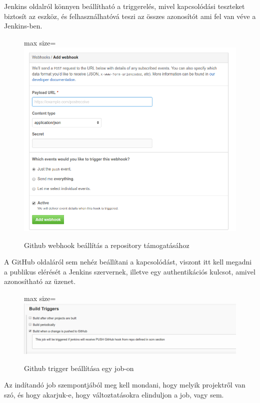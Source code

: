\documentclass[11pt,magyar,a4paper,twoside,]{report}
\let\Oldincludegraphics\includegraphics
\renewcommand{\includegraphics}[1]{
\begin{adjustbox}{max size={\textwidth}{\textheight}}
    \Oldincludegraphics[scale=0.6]{#1}%
\end{adjustbox}
}
\begin{document}
Jenkins oldalról könnyen beállítható a triggerelés, mivel kapcsolódási
teszteket biztosít az eszköz, és felhasználhatóvá teszi az összes
azonosítót ami fel van véve a Jenkins-ben.

\begin{figure}[H]
\centering
\includegraphics{img/github-webhooks.png}
\caption{Github webhook beállítás a repository
támogatásához\label{github-hook}}
\end{figure}

A GitHub oldaláról sem nehéz beállítani a kapcsolódást, viszont itt kell
megadni a publikus elérését a Jenkins szervernek, illetve egy
authentikációs kulcsot, amivel azonosítható az üzenet.

\begin{figure}[H]
\centering
\includegraphics{img/github-trigger.png}
\caption{Github trigger beállítása egy job-on\label{job-trigger}}
\end{figure}

Az indítandó job szempontjából meg kell mondani, hogy melyik projektről
van szó, és hogy akarjuk-e, hogy változtatásokra elinduljon a job, vagy
sem.
\end{document}
